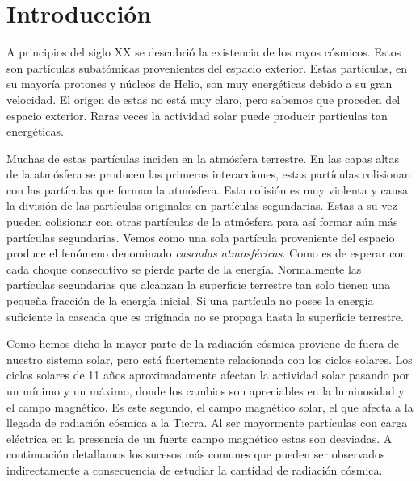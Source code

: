 \chapter{Introducción}
\label{cap1}

A principios del siglo XX se descubrió la existencia de los rayos cósmicos. Estos son partículas subatómicas provenientes del espacio exterior. Estas
partículas, en su mayoría protones y núcleos de Helio, son muy energéticas debido a su gran velocidad. El origen de estas no está muy claro, pero
sabemos que proceden del espacio exterior. Raras veces la actividad solar puede producir partículas tan energéticas. 
\par
Muchas de estas partículas inciden en la atmósfera terrestre. En las capas altas de la atmósfera se producen las primeras interacciones, estas
partículas colisionan con las partículas que forman la atmósfera. Esta colisión es muy violenta y causa la división de las partículas originales en
partículas segundarias. Estas a su vez pueden colisionar con otras partículas de la atmósfera para así formar aún más partículas segundarias. Vemos
como una sola partícula proveniente del espacio produce el fenómeno denominado \emph{cascadas atmosféricas}. Como es de esperar con cada choque
consecutivo se pierde parte de la energía. Normalmente las partículas segundarias que alcanzan la superficie terrestre tan solo tienen una pequeña
fracción de la energía inicial. Si una partícula no posee la energía suficiente la cascada que es originada no se propaga hasta la superficie
terrestre.
\par
Como hemos dicho la mayor parte de la radiación cósmica proviene de fuera de nuestro sistema solar, pero está fuertemente relacionada con los ciclos
solares. Los ciclos solares de 11 años aproximadamente afectan la actividad solar pasando por un mínimo y un máximo, donde los cambios son apreciables
en la luminosidad y el campo magnético. Es este segundo, el campo magnético solar, el que afecta a la llegada de radiación cósmica a la Tierra. Al ser
mayormente partículas con carga eléctrica en la presencia de un fuerte campo magnético estas son desviadas. A continuación detallamos los sucesos más
comunes que pueden ser observados indirectamente a consecuencia de estudiar la cantidad de radiación cósmica.
